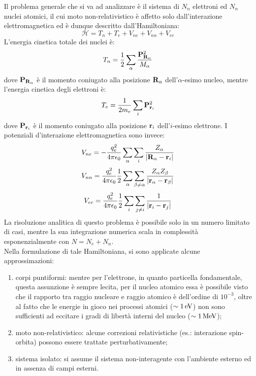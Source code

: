 
Il problema generale che si va ad analizzare è il sistema di $ N_n $ elettroni ed $ N_n $ nuclei atomici, il cui moto non-relativistico è affetto solo dall'interazione elettromagnetica ed è dunque descritto dall'Hamiltoniana:
\begin{equation*}
	\mathcal{H} = T_n + T_e + V_{ne} + V_{nn} + V_{ee}
\end{equation*}
L'energia cinetica totale dei nuclei è:
\begin{equation*}
	T_n = \frac{1}{2} \sum_\alpha \frac{\mathbf{P}_{\mathbf{R}_\alpha}^2}{M_\alpha}
\end{equation*}
dove $ \mathbf{P}_{\mathbf{R}_\alpha} $ è il momento coniugato alla posizione $ \mathbf{R}_\alpha $ dell'$ \alpha $-esimo nucleo, mentre l'energia cinetica degli elettroni è:
\begin{equation*}
	T_e = \frac{1}{2m_e} \sum_i \mathbf{P}_{\mathbf{r}_i}^2
\end{equation*}
dove $ \mathbf{P}_{\mathbf{r}_i} $ è il momento coniugato alla posizione $ \mathbf{r}_i $ dell'$ i $-esimo elettrone. I potenziali d'interazione elettromagnetica sono invece:
\begin{equation*}
	V_{ne} = - \frac{q_e^2}{4\pi \epsilon_0} \sum_\alpha \sum_i \frac{Z_\alpha}{\left\lvert\mathbf{R}_\alpha - \mathbf{r}_i\right\rvert}
\end{equation*}
\begin{equation*}
	V_{nn} = \frac{q_e^2}{4\pi \epsilon_0} \frac{1}{2} \sum_\alpha \sum_{\beta \neq \alpha} \frac{Z_\alpha Z_\beta}{\left\lvert\mathbf{r}_\alpha - \mathbf{r}_\beta\right\rvert}
\end{equation*}
\begin{equation*}
	V_{ee} = \frac{q_e^2}{4\pi \epsilon_0} \frac{1}{2} \sum_i \sum_{j \neq i} \frac{1}{\left\lvert\mathbf{r}_i - \mathbf{r}_j\right\rvert}
\end{equation*}
La risoluzione analitica di questo problema è possibile solo in un numero limitato di casi, mentre la sua integrazione numerica scala in complessità esponenzialmente con $ N = N_e + N_n $.\\
Nella formulazione di tale Hamiltoniana, si sono applicate alcune approssimazioni:
\begin{enumerate}
	\item corpi puntiformi: mentre per l'elettrone, in quanto particella fondamentale, questa assunzione è sempre lecita, per il nucleo atomico essa è possibile visto che il rapporto tra raggio nucleare e raggio atomico è dell'ordine di $ 10^{-3} $, oltre al fatto che le energie in gioco nei processi atomici ($ \sim 1\,\mathrm{eV} $) non sono sufficienti ad eccitare i gradi di libertà interni del nucleo ($ \sim 1\,\mathrm{MeV} $);
	\item moto non-relativistico: alcune correzioni relativistiche (es.: interazione spin-orbita) possono essere trattate perturbativamente;
	\item sistema isolato: si assume il sistema non-interagente con l'ambiente esterno ed in assenza di campi esterni.
\end{enumerate}
